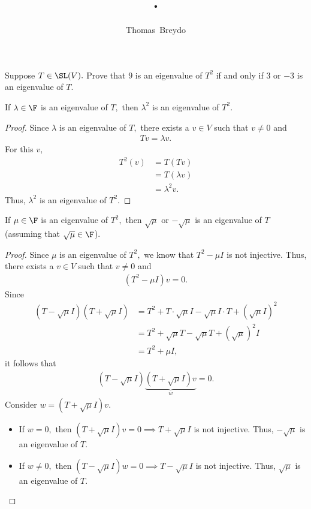 \documentclass{amsart}
\title{\pagenum.\probnum}
\author{Thomas\ Breydo}
\begin{document}
\maketitle

\begin{problem*}
Suppose $T\in\SL(V).$ Prove that $9$ is an eigenvalue of $T^2$
if and only if $3$ or $-3$ is an eigenvalue of $T.$
\end{problem*}

\vspace{0.5in}


\begin{claim}
\label{impl}
If $\lambda\in\F$ is an eigenvalue of $T,$ then $\lambda^2$ is an
eigenvalue of $T^2.$
\end{claim}
\begin{proof}
Since $\lambda$ is an eigenvalue of $T,$ there exists
a $v\in V$ such that $v\ne 0$ and 
\begin{align*}
    Tv=\lambda v.
\end{align*}
For this $v,$
\begin{align*}
    T^2(v)&=T(Tv)\\
          &=T(\lambda v)\\
          &=\lambda^2 v.
\end{align*}
Thus, $\lambda^2$ is an eigenvalue of $T^2.$
\end{proof}



\begin{claim}
\label{conv}
If $\mu\in\F$ is an eigenvalue of $T^2,$ then $\sqrt\mu$ or $-\sqrt\mu$
is an eigenvalue of $T$ (assuming that $\sqrt\mu\in\F$).
\end{claim}
\begin{proof}
Since $\mu$ is an eigenvalue of $T^2,$ we know that
$T^2-\mu I$ is not injective. Thus, there exists
a $v\in V$ such that $v\ne0$ and
\begin{align*}
    (T^2-\mu I)v=0.
\end{align*}
Since
\begin{align*}
    (T-\sqrt\mu I)(T+\sqrt\mu I)
    &= T^2+T\cdot\sqrt\mu I-\sqrt\mu I\cdot T+(\sqrt\mu I)^2 \\
    &= T^2+\sqrt\mu T-\sqrt\mu T+\left(\sqrt\mu\right)^2 I \\
    &= T^2+\mu I,
\end{align*}
it follows that
\begin{align*}
    (T-\sqrt\mu I)\underbrace{(T+\sqrt\mu I)v}_w=0.
\end{align*}
Consider $w=(T+\sqrt\mu I)v$.

\begin{itemize}
\item If $w=0,$ then $(T+\sqrt\mu I)v=0\implies T+\sqrt\mu I$ is
    not injective. Thus, $-\sqrt\mu$ is an eigenvalue of $T.$

\item If $w\ne0,$ then $(T-\sqrt\mu I)w=0\implies T-\sqrt\mu I$ is
    not injective. Thus, $\sqrt\mu$ is an eigenvalue of $T.$\qedhere
\end{itemize}
\end{proof}
\end{document}
